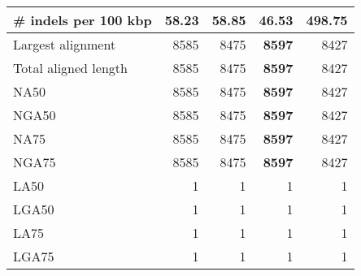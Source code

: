 \documentclass[12pt,a4paper]{article}
\begin{document}
\begin{table}[ht]
\begin{center}
\begin{tabular}{|l*{4}{|r}|}
\# indels per 100 kbp & 58.23 & 58.85 & {\bf 46.53} & 498.75 \\ \hline
Largest alignment & 8585 & 8475 & {\bf 8597} & 8427 \\ \hline
Total aligned length & 8585 & 8475 & {\bf 8597} & 8427 \\ \hline
NA50 & 8585 & 8475 & {\bf 8597} & 8427 \\ \hline
NGA50 & 8585 & 8475 & {\bf 8597} & 8427 \\ \hline
NA75 & 8585 & 8475 & {\bf 8597} & 8427 \\ \hline
NGA75 & 8585 & 8475 & {\bf 8597} & 8427 \\ \hline
LA50 & 1 & 1 & 1 & 1 \\ \hline
LGA50 & 1 & 1 & 1 & 1 \\ \hline
LA75 & 1 & 1 & 1 & 1 \\ \hline
LGA75 & 1 & 1 & 1 & 1 \\ \hline
\end{tabular}
\end{center}
\end{table}
\end{document}
